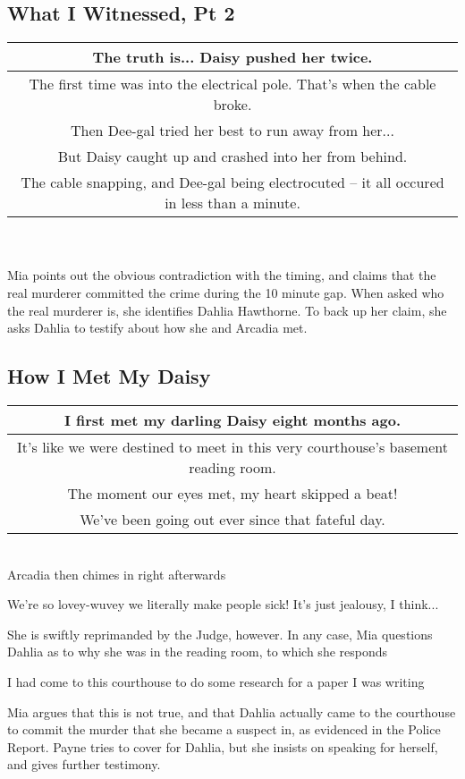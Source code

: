 \subsection{What I Witnessed, Pt 2}
\begin{tabular}{c}
The truth is... Daisy pushed her twice. \\\hline
The first time was into the electrical pole. That's when the cable broke. \\\hline
Then Dee-gal tried her best to run away from her... \\\hline
But Daisy caught up and crashed into her from behind. \\\hline
The cable snapping, and Dee-gal being electrocuted -- it all occured in less than a minute. \\\hline
\end{tabular}\\
\\
Mia points out the obvious contradiction with the timing, and claims that the real murderer committed the crime during the 10 minute gap. When asked who the real murderer is, she identifies Dahlia Hawthorne. To back up her claim, she asks Dahlia to testify about how she and Arcadia met.

\subsection{How I Met My Daisy}
\begin{tabular}{c}
I first met my darling Daisy eight months ago.\\\hline
It's like we were destined to meet in this very courthouse's basement reading room.\\\hline
The moment our eyes met, my heart skipped a beat!\\\hline
We've been going out ever since that fateful day.\\\hline
\end{tabular}\\
Arcadia then chimes in right afterwards
\begin{center}
We're so lovey-wuvey we literally make people sick! It's just jealousy, I think...
\end{center}
She is swiftly reprimanded by the Judge, however. In any case, Mia questions Dahlia as to why she was in the reading room, to which she responds\\
\begin{center}
I had come to this courthouse to do some research for a paper I was writing
\end{center}
Mia argues that this is not true, and that Dahlia actually came to the courthouse to commit the murder that she became a suspect in, as evidenced in the Police Report. Payne tries to cover for Dahlia, but she insists on speaking for herself, and gives further testimony.

